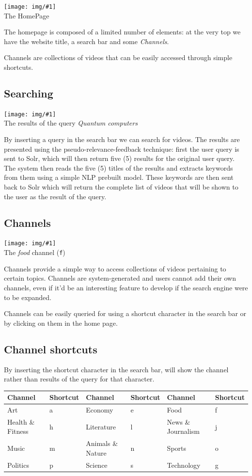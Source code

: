 \documentclass[12pt,numbers=enddot]{exam}
\newcommand{\pic}[2]{{
\begin{center}
\texttt{[image: img/\#1]} \\
{#2}
\end{center}
}}
\begin{document}
\pic{se_home}{The HomePage}

The homepage is composed of a limited number of elements: at the very
top we have the website title, a search bar and some \textit{Channels}.

Channels are collections of videos that can be easily accessed through
simple shortcuts.

\subsection{Searching}

\pic{se_query}{The results of the query \textit{Quantum computers}}

By inserting a query in the search bar we can search for videos.
The results are presented using the pseudo-relevance-feedback technique:
first the user query is sent to Solr, which will then return five (5) 
results for the original user query. The system then reads the five (5)
titles of the results and extracts keywords from them using a simple
NLP prebuilt model. These keywords are then sent back to Solr which will
return the complete list of videos that will be shown to the user as the
result of the query.

\subsection{Channels}

\pic{se_channel}{The \textit{food} channel (\texttt{f})}

Channels provide a simple way to access collections of videos pertaining
to certain topics. Channels are system-generated and users cannot add
their own channels, even if it'd be an interesting feature to develop if
the search engine were to be expanded.

Channels can be easily queried for using a shortcut character in the search
bar or by clicking on them in the home page.

\subsection*{Channel shortcuts}

By inserting the shortcut character in the search bar, will show the channel
rather than results of the query for that character.

\begin{center}
\begin{tabular}{ll|ll|ll}
Channel & Shortcut & Channel & Shortcut & Channel & Shortcut \\\hline
Art               & a & Economy           & e & Food               & f \\
Health \& Fitness & h & Literature        & l & News \& Journalism & j \\
Music             & m & Animals \& Nature & n & Sports             & o \\
Politics          & p & Science           & s & Technology         & g \\
\end{tabular}
\end{center}
\end{document}
